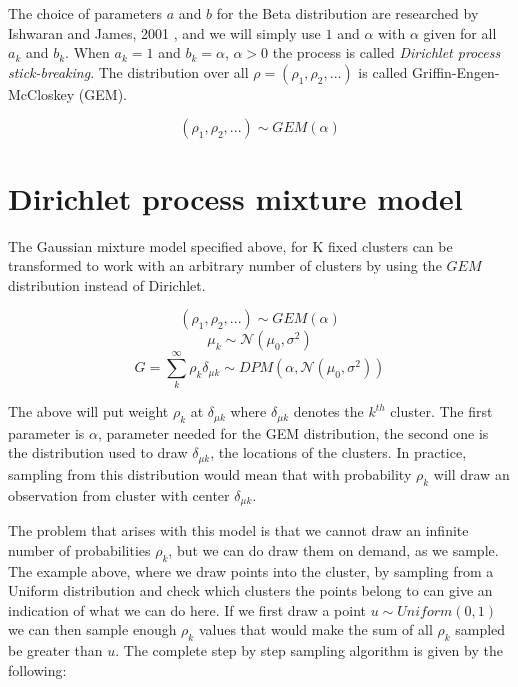 \documentclass[12pt,a4paper]{article}
\begin{document}
The choice of parameters $a$ and $b$ for the Beta distribution are researched by Ishwaran and James, 2001 \cite{ishwaran2001}, and we will simply use $1$ and $\alpha$ with $\alpha$ given for all $a_{k}$ and $b_{k}$. 
When $a_{k}=1$ and $b_{k}=\alpha$, $\alpha > 0$ the process is called \textit{Dirichlet process stick-breaking}. The distribution over all $\rho = (\rho_{1}, \rho_{2}, ...)$ is called Griffin-Engen-McCloskey (GEM). 

$$ (\rho_{1}, \rho_{2}, ...) \sim GEM(\alpha)$$

\section{Dirichlet process mixture model}

The Gaussian mixture model specified above, for K fixed clusters can be transformed to work with an arbitrary number of clusters by using the $GEM$ distribution instead of Dirichlet.

$$(\rho_{1}, \rho_{2}, ...) \sim GEM(\alpha)$$
$$\mu_{k} \sim \mathcal{N}(\mu_{0}, \sigma^2)$$
$$ G = \sum_{k}^{\infty}\rho_{k}\delta_{\mu k} \sim DPM(\alpha, \mathcal{N}(\mu_{0}, \sigma^2))$$

The above will put weight $\rho_{k}$ at $\delta_{\mu k}$ where $\delta_{\mu k}$ denotes the $k^{th}$ cluster. The first parameter is $\alpha$, parameter needed for the GEM distribution, the second one is the distribution used to draw $\delta_{\mu k}$, the locations of the clusters. In practice, sampling from this distribution would mean that with probability $\rho_{k}$ will draw an observation from cluster with center $\delta_{\mu k}$.

The problem that arises with this model is that we cannot draw an infinite number of probabilities $\rho_{k}$, but we can do draw them on demand, as we sample. The example above, where we draw points into the cluster, by sampling from a Uniform distribution and check which clusters the points belong to can give an indication of what we can do here. If we first draw a point $u \sim Uniform(0, 1)$ we can then sample enough $\rho_{k}$ values that would make the sum of all $\rho_{k}$ sampled be greater than $u$. The complete step by step sampling algorithm is given by the following:
\end{document}
